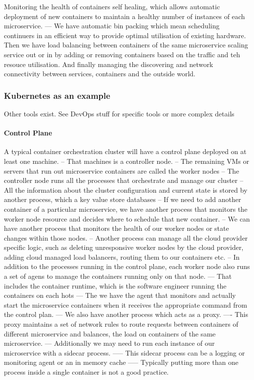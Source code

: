 \documentclass[a4paper, 11pt]{book}
\begin{document}
    Monitoring the health of containers self healing, which allows automatic deployment of new containers to maintain a healthy number of instances of each microservice.
    --- We have automatic bin packing which mean scheduling continuers in an efficient way to provide optimal utilisation of existing hardware.
    Then we have load balancing between containers of the same microservice scaling service out or in by adding or removing containers based on the traffic and teh resouce utilisation.
    And finally managing the discovering and network connectivity between services, containers and the outside world.

    \subsubsection{Kubernetes as an example}
    Other tools exist. See DevOps stuff for specific tools or more complex details

    \paragraph{Control Plane}
    A typical container orchestration cluster will have a control plane deployed on at least one machine.
    -- That machines is a controller node.
    -- The remaining VMs or servers that run out microservice containers are called the worker nodes
    -- The controller node runs all the processes that orchestrate and manage our cluster
    -- All the information about the cluster configuration and current state is stored by another process, which a key value store databases
    -- If we need to add another container of a particular microservice, we have another process that monitors the worker node resource and decides where to schedule that new container.
    -- We can have another process that monitors the health of our worker nodes or state changes within those nodes.
    -- Another process can manage all the cloud provider specific logic, such as deleting unresponsive worker nodes by the cloud provider, adding cloud managed load balancers, routing them to our containers etc.
    -- In addition to the processes running in the control plane, each worker node also runs a set of agens to manage the containers running only on that node.
    --- That includes the container runtime, which is the software engineer running the containers on each hots
    --- The we have the agent that monitors and actually start the microservice containers when it receives the appropriate command from the control plan.
    --- We also have another process which acts as a proxy.
    ---- This proxy maintains a set of network rules to route requests between containers of different microservice and balances, the load on containers of the same microservice.
    --- Additionally we may need to run each instance of our microservice with a sidecar process.
    ----- This sidecar process can be a logging or monitoring agent or an in memory cache
    ----- Typically putting more than one process inside a single container is not a good practice.
\end{document}
